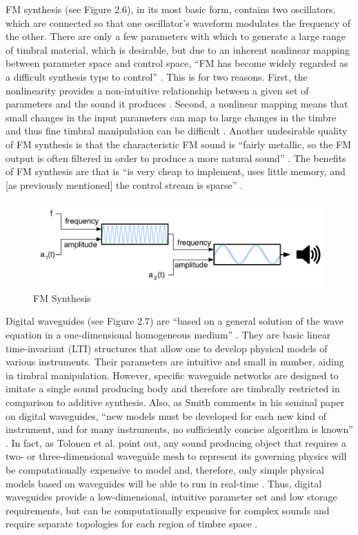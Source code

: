 \documentclass[a4paper,12pt]{report} 	%
\numberwithin{figure}{chapter}
\numberwithin{table}{chapter}
\numberwithin{equation}{chapter}
\begin{document}
\begin{flushleft}
FM synthesis (see Figure 2.6), in its most basic form, contains two oscillators, which are connected so that one oscillator's waveform modulates the frequency of the other. There are only a few parameters with which to generate a large range of timbral material, which is desirable, but due to an inherent nonlinear mapping between parameter space and control space, ``FM has become widely regarded as a difficult synthesis type to control'' \cite{Mitchell:2007fe}. This is for two reasons. First, the nonlinearity provides a non-intuitive relationship between a given set of parameters and the sound it produces \cite[p. 45]{Nicol:2005rp}. Second, a  nonlinear mapping means that small changes in the input parameters can map to large changes in the timbre and thus fine timbral manipulation can be difficult \cite[p. 2]{Jaffe:1995fv}. Another undesirable quality of FM synthesis is that the characteristic FM sound is ``fairly metallic, so the FM output is often filtered in order to produce a more natural sound'' \cite[p. 45]{Nicol:2005rp}. The benefits of FM synthesis are that is ``is very cheap to implement, uses little memory, and [as previously mentioned] the control stream is sparse'' \cite[p. 92]{Tolonen:1998bh}.
\\
\begin{figure}[h!]
\begin{center}
\includegraphics[scale=0.65]{FMSynthesis}
\caption[FM Synthesis]{FM Synthesis}
\end{center}
\end{figure}
Digital waveguides (see Figure 2.7) are ``based on a general solution of the wave equation in a one-dimensional homogeneous medium'' \cite[p. 63]{Tolonen:1998bh}. They are basic linear time-invariant (LTI) structures that allow one to develop physical models of various instruments. Their parameters are intuitive and small in number, aiding in timbral manipulation. However, specific waveguide networks are designed to imitate a single sound producing body and therefore are timbrally restricted in comparison to additive synthesis. Also, as Smith comments in his seminal paper on digital waveguides, ``new models must be developed for each new kind of instrument, and for many instruments, no sufficiently concise algorithm is known'' \cite[p. 86]{III:1992zn}. In fact, as Tolonen et al. point out, any sound producing object that requires a two- or three-dimensional waveguide mesh to represent its governing physics will be computationally expensive to model and, therefore, only simple physical models based on waveguides will be able to run in real-time \cite[p. 99-100]{Tolonen:1998bh}. Thus, digital waveguides provide a low-dimensional, intuitive parameter set and low storage requirements, but can be computationally expensive for complex sounds and require separate topologies for each region of timbre space \cite[p. 50]{Nicol:2005rp}.

\end{flushleft}
\end{document}
